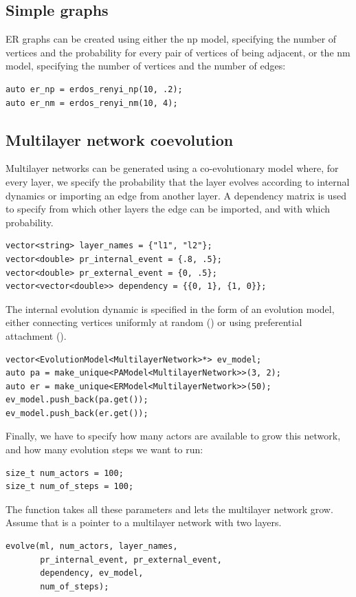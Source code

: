 \subsection{Simple graphs}

ER graphs can be created using either the np model, specifying the number of vertices and the probability for every pair of vertices of being adjacent, or the nm model, specifying the number of vertices and the number of edges:
\begin{lstlisting}[style=c++]
auto er_np = erdos_renyi_np(10, .2);
auto er_nm = erdos_renyi_nm(10, 4); 
\end{lstlisting}

\subsection{Multilayer network coevolution}

Multilayer networks can be generated using a co-evolutionary model where, for every layer, we specify the probability that the layer evolves according to internal dynamics or importing an edge from another layer. A dependency matrix is used to specify from which other layers the edge can be imported, and with which probability.
\begin{lstlisting}[style=c++]
vector<string> layer_names = {"l1", "l2"};
vector<double> pr_internal_event = {.8, .5};
vector<double> pr_external_event = {0, .5};
vector<vector<double>> dependency = {{0, 1}, {1, 0}};
\end{lstlisting}
The internal evolution dynamic is specified in the form of an evolution model, either connecting vertices uniformly at random () or using preferential attachment ().
\begin{lstlisting}[style=c++]
vector<EvolutionModel<MultilayerNetwork>*> ev_model;
auto pa = make_unique<PAModel<MultilayerNetwork>>(3, 2);
auto er = make_unique<ERModel<MultilayerNetwork>>(50);
ev_model.push_back(pa.get());
ev_model.push_back(er.get());
\end{lstlisting}
Finally, we have to specify how many actors are available to grow this network, and how many evolution steps we want to run:
\begin{lstlisting}[style=c++]
size_t num_actors = 100;
size_t num_of_steps = 100;
\end{lstlisting}
    
The function  takes all these parameters and lets the multilayer network grow. Assume that  is a pointer to a multilayer network with two layers.
\begin{lstlisting}[style=c++]
evolve(ml, num_actors, layer_names,
       pr_internal_event, pr_external_event, 
       dependency, ev_model,
       num_of_steps);
\end{lstlisting}


